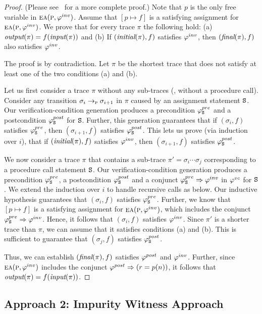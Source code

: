 \begin{proof}
(Please see~\cite{CheckingOP:arxiv} for a more complete proof.)
Note that $p$ is the only free variable in $\textsc{ea}(\textsc{p},\varphi^{inv})$. Assume that $[p \mapsto f]$ is a
satisfying assignment for $\textsc{ea}(\textsc{p},\varphi^{inv})$.
We prove that for every trace $\pi$ the following hold:
(a) $\textit{output}(\pi) = f(\textit{input}(\pi))$ and
(b) If $(\textit{initial}(\pi),f)$ satisfies $\varphi^{inv}$, then $(\textit{final}(\pi),f)$ also satisfies $\varphi^{inv}$.

The proof is by contradiction. Let $\pi$ be the shortest trace that does not satisfy at least
one of the two conditions (a) and (b).

Let us first consider a trace $\pi$ without any sub-traces (\ie, without a procedure call).
Consider any transition $\sigma_i \rightarrow_{\textsc{p}} \sigma_{i+1}$ in $\pi$
caused by an assignment statement $\texttt{S}$. Our verification-condition generation produces
a precondition $\varphi^{pre}_{\texttt{S}}$ and a postcondition $\varphi^{post}_{\texttt{S}}$ for $\texttt{S}$. Further, this generation
guarantees that if $(\sigma_i,f)$ satisfies $\varphi^{pre}_{\texttt{S}}$, then $(\sigma_{i+1},f)$ satisfies $\varphi^{post}_{\texttt{S}}$.
This lets us prove (via induction over $i$), that if $(\textit{initial}(\pi),f)$ satisfies $\varphi^{inv}$,
then $(\sigma_{i+1},f)$ satisfies $\varphi^{post}_{\texttt{S}}$.

We now consider a trace $\pi$ that contains a sub-trace $\pi' = \sigma_i \cdots \sigma_j$ corresponding to a procedure call
statement $\texttt{S}$. Our verification-condition generation produces a precondition $\varphi^{pre}_{\texttt{S}}$,
a postcondition $\varphi^{post}_{\texttt{S}}$  and a conjunct $\varphi^{pre}_{\texttt{S}} \Rightarrow \varphi^{inv}$ in $\varphi^{vc}$ for $\texttt{S}$.
We extend the induction over $i$ to handle recursive calls as below.
Our inductive hypothesis guarantees that $(\sigma_i,f)$ satisfies $\varphi^{pre}_{\texttt{S}}$.
Further, we know that $[p \mapsto f]$ is a satisfying assignment for $\textsc{ea}(\textsc{p},\varphi^{inv})$,
which includes the conjunct $\varphi^{pre}_{\texttt{S}} \Rightarrow \varphi^{inv}$. Hence, it follows that  $(\sigma_i,f)$ satisfies $\varphi^{inv}$.
Since $\pi'$ is a shorter trace than $\pi$, we can assume that it satisfies conditions (a)
and (b). This is sufficient to guarantee that $(\sigma_j,f)$ satisfies $\varphi^{post}_{\texttt{S}}$.

Thus, we can establish $(\textit{final}(\pi),f)$ satisfies $\varphi^{post}$ and $\varphi^{inv}$. Further, since 
$\textsc{ea}(\textsc{p},\varphi^{inv})$ includes the conjunct $\varphi^{post} \Rightarrow (r = p(n))$, it follows that
$\textit{output}(\pi) = f(\textit{input}(\pi))$.
\end{proof}

\subsection{Approach 2: Impurity Witness Approach}

